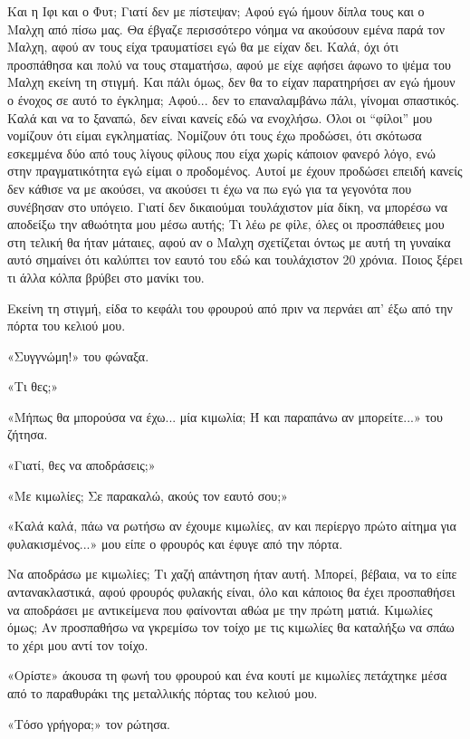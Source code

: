 \documentclass[12pt,twoside, openany]{book}
\begin{document}
Και η Ιφι και ο Φυτ; Γιατί δεν με πίστεψαν; Αφού εγώ ήμουν δίπλα τους και ο Μαλχη από πίσω μας. Θα έβγαζε περισσότερο νόημα να ακούσουν εμένα παρά τον Μαλχη, αφού αν τους είχα τραυματίσει εγώ θα με είχαν δει. Καλά, όχι ότι προσπάθησα και πολύ να τους σταματήσω, αφού με είχε αφήσει άφωνο το ψέμα του Μαλχη εκείνη τη στιγμή. Και πάλι όμως, δεν θα το είχαν παρατηρήσει αν εγώ ήμουν ο ένοχος σε αυτό το έγκλημα; Αφού... δεν το επαναλαμβάνω πάλι, γίνομαι σπαστικός. Καλά και να το ξαναπώ, δεν είναι κανείς εδώ να ενοχλήσω. Όλοι οι “φίλοι” μου νομίζουν ότι είμαι εγκληματίας. Νομίζουν ότι τους έχω προδώσει, ότι σκότωσα εσκεμμένα δύο από τους λίγους φίλους που είχα χωρίς κάποιον φανερό λόγο, ενώ στην πραγματικότητα εγώ είμαι ο προδομένος. Αυτοί με έχουν προδώσει επειδή κανείς δεν κάθισε να με ακούσει, να ακούσει τι έχω να πω εγώ για τα γεγονότα που συνέβησαν στο υπόγειο. Γιατί δεν δικαιούμαι τουλάχιστον μία δίκη, να μπορέσω να αποδείξω την αθωότητα μου μέσω αυτής; Τι λέω ρε φίλε, όλες οι προσπάθειες μου στη τελική θα ήταν μάταιες, αφού αν ο Μαλχη σχετίζεται όντως με αυτή τη γυναίκα αυτό σημαίνει ότι καλύπτει τον εαυτό του εδώ και τουλάχιστον 20 χρόνια. Ποιος ξέρει τι άλλα κόλπα βρύβει στο μανίκι του.

Εκείνη τη στιγμή, είδα το κεφάλι του φρουρού από πριν να περνάει απ’ έξω από την πόρτα του κελιού μου.

«Συγγνώμη!» του φώναξα.

«Τι θες;»

«Μήπως θα μπορούσα να έχω... μία κιμωλία; Ή και παραπάνω αν μπορείτε...» του ζήτησα.

«Γιατί, θες να αποδράσεις;»

«Με κιμωλίες; Σε παρακαλώ, ακούς τον εαυτό σου;»

«Καλά καλά, πάω να ρωτήσω αν έχουμε κιμωλίες, αν και περίεργο πρώτο αίτημα για φυλακισμένος...» μου είπε ο φρουρός και έφυγε από την πόρτα.

Να αποδράσω με κιμωλίες; Τι χαζή απάντηση ήταν αυτή. Μπορεί, βέβαια, να το είπε αντανακλαστικά, αφού φρουρός φυλακής είναι, όλο και κάποιος θα έχει προσπαθήσει να αποδράσει με αντικείμενα που φαίνονται αθώα με την πρώτη ματιά. Κιμωλίες όμως; Αν προσπαθήσω να γκρεμίσω τον τοίχο με τις κιμωλίες θα καταλήξω να σπάω το χέρι μου αντί τον τοίχο.

«Ορίστε» άκουσα τη φωνή του φρουρού και ένα κουτί με κιμωλίες πετάχτηκε μέσα από το παραθυράκι της μεταλλικής πόρτας του κελιού μου.

«Τόσο γρήγορα;» τον ρώτησα.
\end{document}
